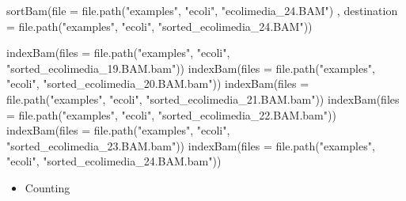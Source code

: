 \documentclass[
]{book}
\newenvironment{Shaded}{\begin{snugshade}}{\end{snugshade}}
\newcommand{\AttributeTok}[1]{\textcolor[rgb]{0.77,0.63,0.00}{#1}}
\newcommand{\FunctionTok}[1]{\textcolor[rgb]{0.00,0.00,0.00}{#1}}
\newcommand{\NormalTok}[1]{#1}
\newcommand{\StringTok}[1]{\textcolor[rgb]{0.31,0.60,0.02}{#1}}
\providecommand{\tightlist}{%
  \setlength{\itemsep}{0pt}\setlength{\parskip}{0pt}}
\begin{document}
\begin{Shaded}
\begin{Highlighting}[]
\FunctionTok{sortBam}\NormalTok{(}\AttributeTok{file =} \FunctionTok{file.path}\NormalTok{(}\StringTok{"examples"}\NormalTok{, }\StringTok{"ecoli"}\NormalTok{, }\StringTok{"ecolimedia\_24.BAM"}\NormalTok{)}
\NormalTok{        , }\AttributeTok{destination =} \FunctionTok{file.path}\NormalTok{(}\StringTok{"examples"}\NormalTok{, }\StringTok{"ecoli"}\NormalTok{, }\StringTok{"sorted\_ecolimedia\_24.BAM"}\NormalTok{))}

\FunctionTok{indexBam}\NormalTok{(}\AttributeTok{files =} \FunctionTok{file.path}\NormalTok{(}\StringTok{"examples"}\NormalTok{, }\StringTok{"ecoli"}\NormalTok{, }\StringTok{"sorted\_ecolimedia\_19.BAM.bam"}\NormalTok{))}
\FunctionTok{indexBam}\NormalTok{(}\AttributeTok{files =} \FunctionTok{file.path}\NormalTok{(}\StringTok{"examples"}\NormalTok{, }\StringTok{"ecoli"}\NormalTok{, }\StringTok{"sorted\_ecolimedia\_20.BAM.bam"}\NormalTok{))}
\FunctionTok{indexBam}\NormalTok{(}\AttributeTok{files =} \FunctionTok{file.path}\NormalTok{(}\StringTok{"examples"}\NormalTok{, }\StringTok{"ecoli"}\NormalTok{, }\StringTok{"sorted\_ecolimedia\_21.BAM.bam"}\NormalTok{))}
\FunctionTok{indexBam}\NormalTok{(}\AttributeTok{files =} \FunctionTok{file.path}\NormalTok{(}\StringTok{"examples"}\NormalTok{, }\StringTok{"ecoli"}\NormalTok{, }\StringTok{"sorted\_ecolimedia\_22.BAM.bam"}\NormalTok{))}
\FunctionTok{indexBam}\NormalTok{(}\AttributeTok{files =} \FunctionTok{file.path}\NormalTok{(}\StringTok{"examples"}\NormalTok{, }\StringTok{"ecoli"}\NormalTok{, }\StringTok{"sorted\_ecolimedia\_23.BAM.bam"}\NormalTok{))}
\FunctionTok{indexBam}\NormalTok{(}\AttributeTok{files =} \FunctionTok{file.path}\NormalTok{(}\StringTok{"examples"}\NormalTok{, }\StringTok{"ecoli"}\NormalTok{, }\StringTok{"sorted\_ecolimedia\_24.BAM.bam"}\NormalTok{))}
\end{Highlighting}
\end{Shaded}

\begin{itemize}
\tightlist
\item
  Counting
\end{itemize}
\end{document}
